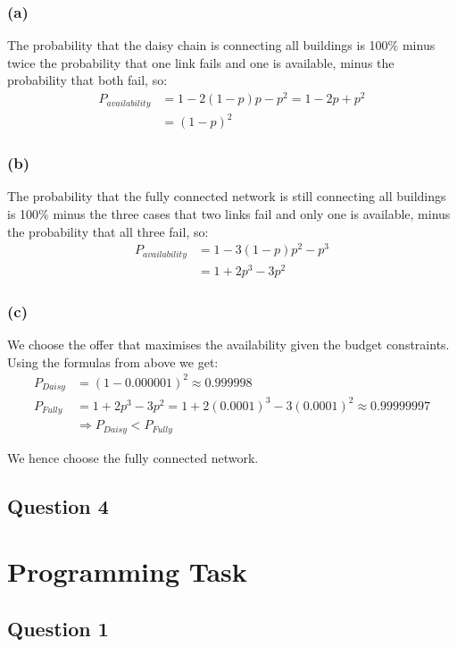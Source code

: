 \documentclass[12pt,a4paper,fleqn]{article}
\begin{document}
\subsubsection*{(a)}
The probability that the daisy chain is connecting all buildings is 100\% minus twice the probability that one link fails and one is available, minus the probability that both fail, so: 
\begin{align*}
P_{availability} &= 1-2(1-p)p - p^2 = 1-2p + p^2 \\
&= (1-p)^2
\end{align*}

\subsubsection*{(b)}
The probability that the fully connected network is still connecting all buildings is 100\% minus the three cases that two links fail and only one is available, minus the probability that all three fail, so:
\begin{align*}
P_{availability} &= 1-3(1-p)p^2 - p^3 \\
&= 1 + 2p^3 - 3p^2
\end{align*}

\subsubsection*{(c)}
We choose the offer that maximises the availability given the budget constraints. Using the formulas from above we get:
\begin{align*}
P_{Daisy} &= (1-0.000001)^2 \approx 0.999998 \\
P_{Fully} &= 1 + 2p^3 - 3p^2 = 1 + 2(0.0001)^3-3(0.0001)^2 \approx 0.99999997 \\ 
&\Rightarrow P_{Daisy} < P_{Fully}
\end{align*}

We hence choose the fully connected network.

\subsection*{Question 4}
\label{sec:eq4}

\section*{Programming Task} 
\label{sec:programming}

\subsection*{Question 1}
\label{sec:pq1}
\end{document}

